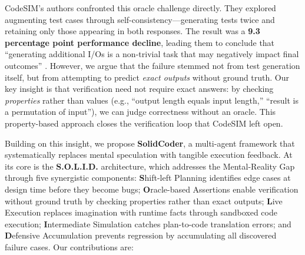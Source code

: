 \documentclass[11pt]{article}
\begin{document}
CodeSIM's authors confronted this oracle challenge directly. They explored augmenting test cases through self-consistency---generating tests twice and retaining only those appearing in both responses. The result was a \textbf{9.3 percentage point performance decline}, leading them to conclude that ``generating additional I/Os is a non-trivial task that may negatively impact final outcomes'' \citep{islam2025codesim}. However, we argue that the failure stemmed not from test generation itself, but from attempting to predict \textit{exact outputs} without ground truth. Our key insight is that verification need not require exact answers: by checking \textit{properties} rather than values (e.g., ``output length equals input length,'' ``result is a permutation of input''), we can judge correctness without an oracle. This property-based approach closes the verification loop that CodeSIM left open.

Building on this insight, we propose \textbf{SolidCoder}, a multi-agent framework that systematically replaces mental speculation with tangible execution feedback. At its core is the \textbf{S.O.L.I.D.} architecture, which addresses the Mental-Reality Gap through five synergistic components: \textbf{S}hift-left Planning identifies edge cases at design time before they become bugs; \textbf{O}racle-based Assertions enable verification without ground truth by checking properties rather than exact outputs; \textbf{L}ive Execution replaces imagination with runtime facts through sandboxed code execution; \textbf{I}ntermediate Simulation catches plan-to-code translation errors; and \textbf{D}efensive Accumulation prevents regression by accumulating all discovered failure cases. Our contributions are:
\end{document}
